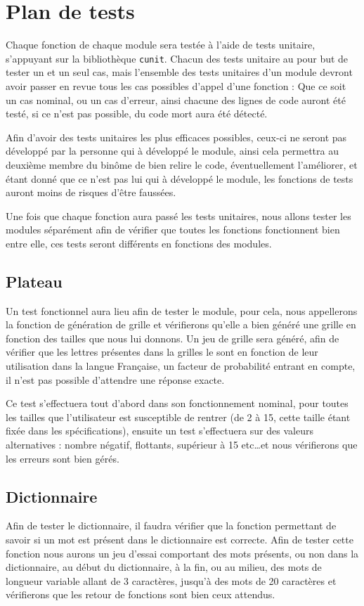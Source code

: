 \documentclass[12pt,a4paper,openany]{article}
\begin{document}
	\section{Plan de tests}
	Chaque fonction de chaque module sera testée à l'aide de tests unitaire, s'appuyant sur la bibliothèque \texttt{cunit}. Chacun des tests unitaire au pour but
	de tester un et un seul cas, mais l'ensemble des tests unitaires d'un module devront avoir passer en revue tous les cas possibles d'appel d'une fonction :
	Que ce soit un cas nominal, ou un cas d'erreur, ainsi chacune des lignes de code auront été testé, si ce n'est pas possible, du code mort aura été détecté. 

	Afin d'avoir des tests unitaires les plus efficaces possibles, ceux-ci ne seront pas développé par la personne qui à développé le module, ainsi cela
	permettra au deuxième membre du binôme de bien relire le code, éventuellement l'améliorer, et étant donné que ce n'est pas lui qui à développé le module, les
	fonctions de tests auront moins de risques d'être faussées.

	Une fois que chaque fonction aura passé les tests unitaires, nous allons tester les modules séparément afin de vérifier que toutes les fonctions fonctionnent
	bien entre elle, ces tests seront différents en fonctions des modules.

	\subsection{Plateau}
		Un test fonctionnel aura lieu afin de tester le module, pour cela, nous appellerons la fonction de génération de grille et vérifierons qu'elle a bien
		généré une grille en fonction des tailles que nous lui donnons. Un jeu de grille sera généré, afin de vérifier que les lettres présentes dans la grilles
		le sont en fonction de leur utilisation dans la langue Française, un facteur de probabilité entrant en compte, il n'est pas possible d'attendre une
		réponse exacte.

		Ce test s'effectuera tout d'abord dans son fonctionnement nominal, pour toutes les tailles que l'utilisateur est susceptible de rentrer (de 2 à 15, cette
		taille étant fixée dans les spécifications), ensuite un test s'effectuera sur des valeurs alternatives : nombre négatif, flottants, supérieur à 15
		etc\ldots et nous vérifierons que les erreurs sont bien gérés.
	\subsection{Dictionnaire}
		Afin de tester le dictionnaire, il faudra vérifier que la fonction permettant de savoir si un mot est présent dans le
		dictionnaire est correcte. Afin de tester cette fonction nous aurons un jeu d'essai comportant des mots présents, ou non dans la dictionnaire, au début
		du dictionnaire, à la fin, ou au milieu, des mots de longueur variable allant de 3 caractères, jusqu'à des mots de 20 caractères  
		et vérifierons que les retour de fonctions sont bien ceux attendus.
\end{document}
